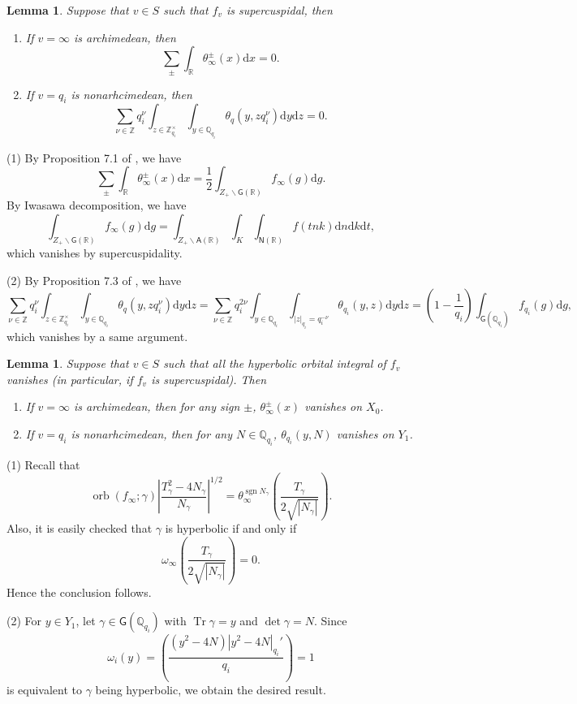 \documentclass[10pt,oneside,reqno]{amsart}
\makeatletter
\newcommand\rmd{\mathrm{d}}
\newcommand\QQ{\mathbb{Q}}
\newcommand\RR{\mathbb{R}}
\newcommand\ZZ{\mathbb{Z}}
\newcommand\A{\mathsf{A}}
\newcommand\G{\mathsf{G}}
\newcommand\N{\mathsf{N}}
\newcommand\bs{\backslash}
\DeclareMathOperator\Tr{Tr}
\DeclareMathOperator\sgn{sgn}
\DeclareMathOperator\orb{orb}
\newcommand\legendresymbol[2]{\genfrac{(}{)}{}{}{#1}{#2}}
\theoremstyle{THEOREM}
\newtheorem{lemma}[theorem]{Lemma}
\theoremstyle{DEFINITION}
\theoremstyle{EXERCISE}
\numberwithin{equation}{section}
\renewenvironment{proof}[1][\proofname]{\par
  \vspace{-6pt}
  \pushQED{\qed}
  \normalfont \topsep6\p@\@plus6\p@\relax
  \trivlist
  \item[\hskip\labelsep\rmfamily\bfseries
    #1\@addpunct{:}]\ignorespaces
}{
  \popQED\endtrivlist\@endpefalse
  \vspace{-6pt}
}
\makeatother
\begin{document}
\begin{lemma}\label{lem:supercuspidaltrivialvanish}
Suppose that $v\in S$ such that $f_v$ is supercuspidal, then
\begin{enumerate}[itemsep=0pt,parsep=0pt,topsep=0pt, leftmargin=0pt,labelsep=2.5pt,itemindent=15pt,label=\upshape{(\arabic*)}]
  \item If $v=\infty$ is archimedean, then 
  \[
  \sum_{\pm}\int_{\RR}\theta_\infty^\pm (x)\rmd x=0.
  \]
\item If $v=q_i$ is nonarhcimedean, then
\[
\sum_{\nu\in \ZZ}q_i^{\nu}\int_{z\in\ZZ_{q_i}^\times}\int_{y\in\QQ_{q_i}}\theta_{q}(y,z q_i^\nu)\rmd y\rmd z=0.
\]
\end{enumerate}
\end{lemma}
\begin{proof}
(1) By Proposition 7.1 of \cite{cheng2025}, we have
\[
\sum_{\pm}\int_{\RR}\theta_\infty^\pm (x)\rmd x=\frac12\int_{Z_+\bs \G(\RR)}f_\infty(g)\rmd g.
\]
By Iwasawa decomposition, we have
\[
\int_{Z_+\bs \G(\RR)}f_\infty(g)\rmd g=\int_{Z_+\bs \A(\RR)}\int_{K}\int_{\N(\RR)}f(tnk)\rmd n\rmd k\rmd t,
\]
which vanishes by supercuspidality.

(2) By Proposition 7.3 of \cite{cheng2025}, we have
\[
\sum_{\nu\in \ZZ}q_i^{\nu}\int_{z\in\ZZ_{q_i}^\times}\int_{y\in\QQ_{q_i}}\theta_{q}(y,z q_i^\nu)\rmd y\rmd z=\sum_{\nu\in \ZZ}q_i^{2\nu}\int_{y\in \QQ_{q_i}}\int_{|z|_{q_i}= q_i^{-\nu}}\theta_{q_i}(y,z)\rmd y\rmd z=\left(1-\frac{1}{q_i}\right)\int_{\G(\QQ_{q_i})}f_{q_i}(g)\rmd g,
\]
which vanishes by a same argument.
\end{proof}

\begin{lemma}\label{lem:hyperbolicvanish}
Suppose that $v\in S$ such that all the hyperbolic orbital integral of $f_v$ vanishes (in particular, if $f_v$ is supercuspidal). Then
\begin{enumerate}[itemsep=0pt,parsep=0pt,topsep=0pt, leftmargin=0pt,labelsep=2.5pt,itemindent=15pt,label=\upshape{(\arabic*)}]
  \item If $v=\infty$ is archimedean, then for any sign $\pm$, $\theta_\infty^{\pm}(x)$ vanishes on $X_0$.
\item If $v=q_i$ is nonarhcimedean, then for any $N\in \QQ_{q_i}$, $\theta_{q_i}(y,N)$ vanishes on $Y_1$.
\end{enumerate}
\end{lemma}

\begin{proof}
(1) Recall that
\[
\orb(f_\infty;\gamma)\left|\frac{T_\gamma^2-4N_\gamma}{N_\gamma}\right|^{1/2} 
     = \theta_\infty^{\sgn N_\gamma}\left(\frac{T_\gamma}{2\sqrt{|N_\gamma|}}\right).
\]
Also, it is easily checked that $\gamma$ is hyperbolic if and only if 
\[
\omega_\infty\left(\frac{T_\gamma}{2\sqrt{|N_\gamma|}}\right)=0.
\]
Hence the conclusion follows.

(2) For $y\in Y_1$, let $\gamma\in \G(\QQ_{q_i})$ with $\Tr \gamma=y$ and $\det\gamma=N$. Since
\[
\omega_i(y)=\legendresymbol{(y^2-4N)|y^2-4N|_{q_i}'}{q_i}=1
\]
is equivalent to $\gamma$ being hyperbolic, we obtain the desired result.
\end{proof}
\end{document}
